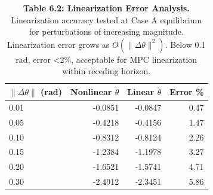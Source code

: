 \begin{table}[H]
\centering
\caption{\textbf{Table 6.2: Linearization Error Analysis.} Linearization accuracy tested at Case A equilibrium for perturbations of increasing magnitude. Linearization error grows as $O(\|\Delta\theta\|^2)$. Below 0.1 rad, error <2\%, acceptable for MPC linearization within receding horizon.}
\label{tab:6-2}
\small
\begin{tabular}{lrrr}
\toprule
\textbf{$\|\Delta\theta\|$ (rad)} & \textbf{Nonlinear $\ddot{\theta}$} & \textbf{Linear $\ddot{\theta}$} & \textbf{Error \%} \\
\midrule
\rowcolor{gray!15}
0.01 & -0.0851 & -0.0847 & 0.47 \\
0.05 & -0.4218 & -0.4156 & 1.47 \\
\rowcolor{gray!15}
0.10 & -0.8312 & -0.8124 & 2.26 \\
0.15 & -1.2384 & -1.1978 & 3.27 \\
\rowcolor{gray!15}
0.20 & -1.6521 & -1.5741 & 4.71 \\
0.30 & -2.4912 & -2.3451 & 5.86 \\
\bottomrule
\end{tabular}
\end{table}
